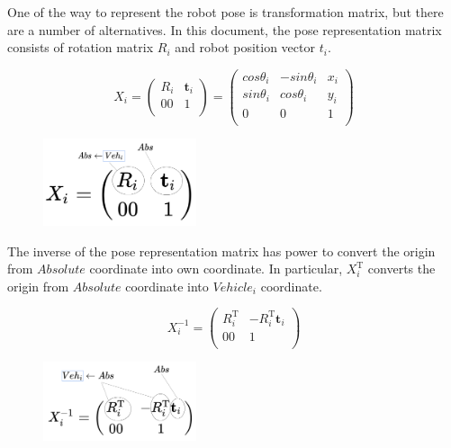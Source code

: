 \documentclass{article}
\begin{document}
One of the way to represent the robot pose is transformation matrix, but there are a number of alternatives.
In this document, the pose representation matrix consists of rotation matrix $R_i$ and robot position vector $t_i$.

\[
X_i =
\left(
  \begin{array}{ccc}
    R_i & \bm{t}_i \\
     00 &          1 \\
  \end{array}
\right)
=
\left(
  \begin{array}{ccc}
    cos\theta_i & -sin\theta_i & x_i \\
    sin\theta_i &  cos\theta_i & y_i \\
              0 &            0 &   1 \\
  \end{array}
\right)
\]

\begin{figure}[h!]
  \centering
  \includegraphics[width=0.4\textwidth]{2-3_pose_representation_matrix.png}
\end{figure}

The inverse of the pose representation matrix has power to convert the origin from $Absolute$ coordinate into own coordinate.
In particular, $X_i^{\mathrm{T}}$ converts the origin from $Absolute$ coordinate into $Vehicle_i$ coordinate.

\[
X_i^{-1} =
\left(
  \begin{array}{ccc}
    R_i^{\mathrm{T}} & -R_i^{\mathrm{T}}\bm{t}_i \\
                  00 &                           1 \\
  \end{array}
\right)
\]

\begin{figure}[h!]
  \centering
  \includegraphics[width=0.4\textwidth]{2-4_pose_representation_matrix_inverse.png}
\end{figure}
\end{document}
